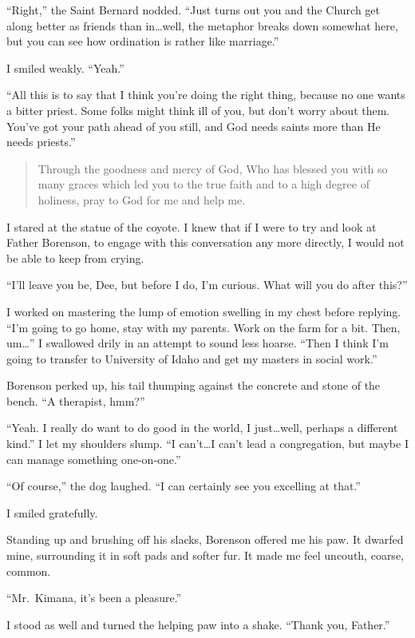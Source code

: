 ``Right,'' the Saint Bernard nodded. ``Just turns out you and the Church get along better as friends than in\ldots well, the metaphor breaks down somewhat here, but you can see how ordination is rather like marriage.''

I smiled weakly. ``Yeah.''

``All this is to say that I think you're doing the right thing, because no one wants a bitter priest. Some folks might think ill of you, but don't worry about them. You've got your path ahead of you still, and God needs saints more than He needs priests.''

\begin{quote}
Through the goodness and mercy of God, Who has blessed you with so many graces which led you to the true faith and to a high degree of holiness, pray to God for me and help me.
\end{quote}

I stared at the statue of the coyote. I knew that if I were to try and look at Father Borenson, to engage with this conversation any more directly, I would not be able to keep from crying.

``I'll leave you be, Dee, but before I do, I'm curious. What will you do after this?''

I worked on mastering the lump of emotion swelling in my chest before replying. ``I'm going to go home, stay with my parents. Work on the farm for a bit. Then, um\ldots{}'' I swallowed drily in an attempt to sound less hoarse. ``Then I think I'm going to transfer to University of Idaho and get my masters in social work.''

Borenson perked up, his tail thumping against the concrete and stone of the bench. ``A therapist, hmm?''

``Yeah. I really do want to do good in the world, I just\ldots well, perhaps a different kind.'' I let my shoulders slump. ``I can't\ldots I can't lead a congregation, but maybe I can manage something one-on-one.''

``Of course,'' the dog laughed. ``I can certainly see you excelling at that.''

I smiled gratefully.

Standing up and brushing off his slacks, Borenson offered me his paw. It dwarfed mine, surrounding it in soft pads and softer fur. It made me feel uncouth, coarse, common.

``Mr.~Kimana, it's been a pleasure.''

I stood as well and turned the helping paw into a shake. ``Thank you, Father.''

